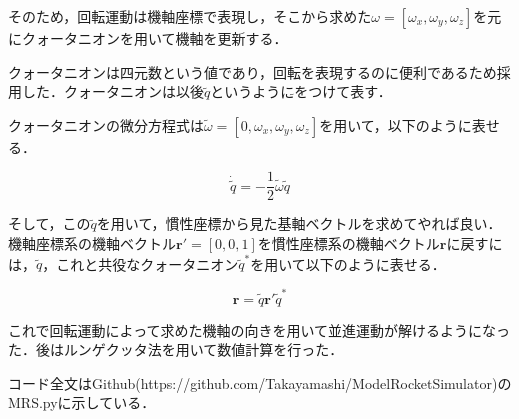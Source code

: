 \documentclass{jsarticle}
\begin{document}
そのため，回転運動は機軸座標で表現し，そこから求めた$\omega = [\omega_x, \omega_y, \omega_z]$を元にクォータニオンを用いて機軸を更新する．

クォータニオンは四元数という値であり，回転を表現するのに便利であるため採用した．クォータニオンは以後$\tilde{q}$というように$\tilde{}$をつけて表す．

クォータニオンの微分方程式は$\tilde{\omega} = [0, \omega_x, \omega_y, \omega_z]$を用いて，以下のように表せる．

\begin{equation}
\dot{\tilde{q}} = -\frac{1}{2}\tilde{\omega}\tilde{q}
\end{equation}

そして，この$\tilde{q}$を用いて，慣性座標から見た基軸ベクトルを求めてやれば良い．機軸座標系の機軸ベクトル$\bm{r'} = [0,0,1]$を慣性座標系の機軸ベクトル$\bm{r}$に戻すには，$\tilde{q}$，これと共役なクォータニオン$\tilde{q}^*$を用いて以下のように表せる．

\begin{equation}
\bm{r} = \tilde{q} \bm{r'} \tilde{q}^*
\end{equation}

これで回転運動によって求めた機軸の向きを用いて並進運動が解けるようになった．後はルンゲクッタ法を用いて数値計算を行った．

コード全文はGithub(https://github.com/Takayamashi/ModelRocketSimulator)のMRS.pyに示している．
\end{document}
